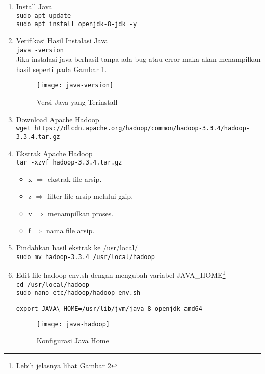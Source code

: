\documentclass[a4paper]{tufte-handout}
\begin{document}
\begin{enumerate}
\item Install Java \\
{\tt sudo apt update} \\
{\tt sudo apt install openjdk-8-jdk -y} \\

\item Verifikasi Hasil Instalasi Java \\
{\tt java -version} \\
Jika instalasi java berhasil tanpa ada bug atau error maka akan menampilkan hasil seperti pada Gambar \ref{gam:java-version}.
\begin{figure}
\texttt{[image: java-version]}
\caption{Versi Java yang Terinstall}
\label{gam:java-version}
\end{figure}

\item Download Apache Hadoop \\
{\tt wget https://dlcdn.apache.org/hadoop/common/hadoop-3.3.4/hadoop-3.3.4.tar.gz}

\item Ekstrak Apache Hadoop \\
{\tt tar -xzvf hadoop-3.3.4.tar.gz }
\begin{itemize}
\item x $\Rightarrow$ ekstrak file arsip.
\item z $\Rightarrow$ filter file arsip melalui gzip.
\item v $\Rightarrow$ menampilkan proses.
\item f $\Rightarrow$ nama file arsip.
\end{itemize}

\item Pindahkan hasil ekstrak ke /usr/local/ \\
{\tt sudo mv hadoop-3.3.4 /usr/local/hadoop}

\item Edit file hadoop-env.sh dengan mengubah variabel JAVA\_HOME\footnote{Lebih jelasnya lihat Gambar \ref{gam:java-hadoop}} \\
{\tt cd /usr/local/hadoop} \\
{\tt sudo nano etc/hadoop/hadoop-env.sh} \\
\begin{lstlisting}
export JAVA\_HOME=/usr/lib/jvm/java-8-openjdk-amd64
\end{lstlisting}
\begin{figure}[!ht]
\centering
\texttt{[image: java-hadoop]}
\caption{Konfigurasi Java Home}
\label{gam:java-hadoop}
\end{figure}


\end{enumerate}
\end{document}
